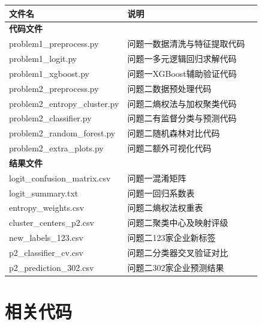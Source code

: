 \documentclass[12pt,a4paper,AutoFakeBold=2]{ctexart}
\begin{document}
\begin{table}[H]
\centering
{}
\begin{tabular}{lll}
\toprule
文件名 &  说明 \\
\midrule
\multicolumn{2}{l}{\textbf{代码文件}} \\
problem1\_preprocess.py   & 问题一数据清洗与特征提取代码 \\
problem1\_logit.py   & 问题一多元逻辑回归求解代码 \\
problem1\_xgboost.py   & 问题一XGBoost辅助验证代码 \\
problem2\_preprocess.py   & 问题二数据预处理代码 \\
problem2\_entropy\_cluster.py   & 问题二熵权法与加权聚类代码 \\
problem2\_classifier.py   & 问题二有监督分类与预测代码 \\
problem2\_random\_forest.py   & 问题二随机森林对比代码 \\
problem2\_extra\_plots.py   & 问题二额外可视化代码 \\
\midrule
\multicolumn{2}{l}{\textbf{结果文件}} \\
logit\_confusion\_matrix.csv   & 问题一混淆矩阵 \\
logit\_summary.txt   & 问题一回归系数表 \\
entropy\_weights.csv   & 问题二熵权法权重表 \\
cluster\_centers\_p2.csv   & 问题二聚类中心及映射评级 \\
new\_labels\_123.csv   & 问题二123家企业新标签 \\
p2\_classifier\_cv.csv   & 问题二分类器交叉验证对比 \\
p2\_prediction\_302.csv   & 问题二302家企业预测结果 \\
\midrule

\end{tabular}
\end{table}


\section{相关代码}


\newpage









\end{document}
